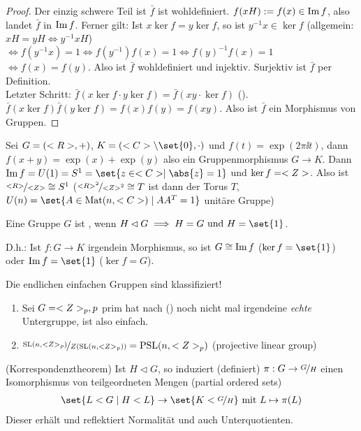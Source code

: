 \begin{proof} %
	Der einzig schwere Teil ist $\bar{f}$ ist wohldefiniert. $f(xH) := f(x) \in \operatorname{Im} f$, also landet $\bar{f}$ in $\operatorname{Im} f$. Ferner gilt: Ist $x \ker f = y \ker f$, so ist $y^{-1}x \in \ker f$ (allgemein: $xH = yH \Leftrightarrow y^{-1}xH$) $\Leftrightarrow f(y^{-1}x) = 1 \Leftrightarrow f(y^{-1})f(x) = 1 \Leftrightarrow f(y)^{-1}f(x) = 1$ $\Leftrightarrow f(x) = f(y)$. Also ist $\bar{f}$ wohldefiniert und injektiv. Surjektiv ist $\bar{f}$ per Definition.\\
	Letzter Schritt: $\bar{f}(x \ker f \cdot y \ker f) = \bar{f}(xy \cdot \ker f)$ (). $\bar{f}(x \ker f)\bar{f}(y\ker f) = f(x)f(y) = f(xy)$. Also ist $\bar{f}$ ein Morphismus von Gruppen.
\end{proof}
\begin{example}
	Sei $G = (<R>, +)$, $K = (\C\setminus \set{0},\cdot)$ und $f(t) = \exp(2\pi \ii t)$, dann $f(x+y) = \exp(x) + \exp(y)$ also ein Gruppenmorphismus $G \to K$. Dann $\Image f = U(1) = S^1 = \set{z \in \C \mid \abs{z} = 1}$ und $\ker f = <Z>$. Also ist $\lnkset{\R}{\Z} \cong S^1$ ($\lnkset{\R^2}{\Z^2} \cong T$ ist dann der Torus $T$, $U(n) = \set{A \in \Mat(n, \C) \mid AA^T = 1}$ unitäre Gruppe)
\end{example}
\begin{definition}
	Eine Gruppe $G$ ist , wenn $H \lhd G \implies H = G \und H = \set{1}$.
\end{definition}
\begin{*remark}
	D.h.: Ist $f: G \to K$ irgendein Morphismus, so ist $G \cong \operatorname{Im} f$ ($\ker f = \set{1}$) oder $\Image f = \set{1}$ ($\ker f = G$).
\end{*remark}
Die endlichen einfachen Gruppen sind klassifiziert!
\begin{example}
	\begin{enumerate}
		\item Sei $G = <Z>_p, p$ prim hat nach  () noch nicht mal irgendeine \emph{echte} Untergruppe, ist also einfach.
		\item $\lnkset{\SL(n, \Z_p)}{Z(\SL(n, \Z_p))} = \PSL(n, \Z_p)$ (projective linear group)
	\end{enumerate}
\end{example}
\begin{proposition}(Korrespondenztheorem)
	Ist $H \lhd G$, so induziert (definiert) $\pi: G \to \lnkset{G}{H}$ einen Isomorphismus von teilgeordneten Mengen (partial ordered sets)
	\begin{align*}
		\set{L < G \mid H < L} \to \set{K < \lnkset{G}{H}} \mit L \mapsto \pi(L)
	\end{align*}
	Dieser erhält und reflektiert Normalität und auch Unterquotienten. 
\end{proposition}